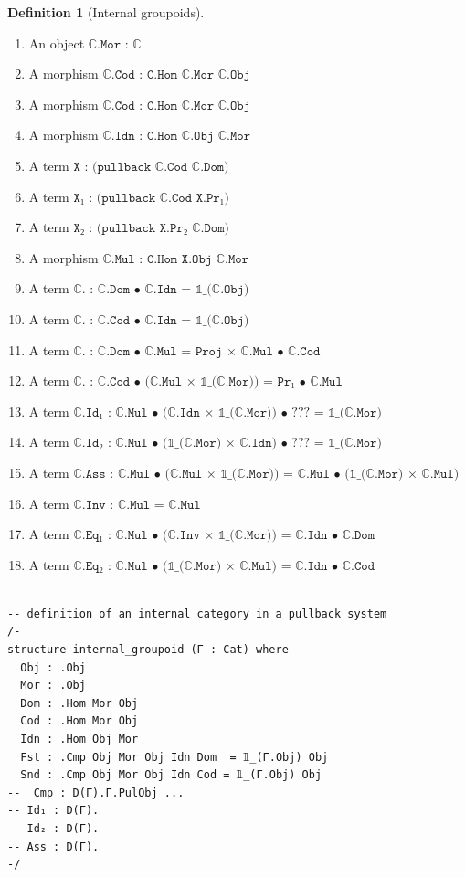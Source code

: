 \documentclass{book}
\theoremstyle{definition}
\newtheorem{definition}{Definition}
\newcounter{lcounter}
\begin{document}
\begin{definition}[Internal groupoids] 
\begin{enumerate}
\item An object $\texttt{ℂ.Mor : ℂ}$ 
\item A morphism $\texttt{ℂ.Cod : C.Hom ℂ.Mor ℂ.Obj}$
\item A morphism $\texttt{ℂ.Cod : C.Hom ℂ.Mor ℂ.Obj}$
\item A morphism $\texttt{ℂ.Idn : C.Hom ℂ.Obj ℂ.Mor}$
\item A term $\texttt{X : (pullback ℂ.Cod ℂ.Dom)}$
\item A term $\texttt{X₁ : (pullback ℂ.Cod X.Pr₁)}$
\item A term $\texttt{X₂ : (pullback X.Pr₂ ℂ.Dom)}$
\item A morphism $\texttt{ℂ.Mul : C.Hom X.Obj ℂ.Mor}$
\item A term $\texttt{ℂ. : ℂ.Dom • ℂ.Idn = 𝟙\_(ℂ.Obj)}$
\item A term $\texttt{ℂ. : ℂ.Cod • ℂ.Idn = 𝟙\_(ℂ.Obj)}$
\item A term $\texttt{ℂ. : ℂ.Dom • ℂ.Mul =  Proj × ℂ.Mul • ℂ.Cod}$
\item A term $\texttt{ℂ. : ℂ.Cod • (ℂ.Mul × 𝟙\_(ℂ.Mor)) = Pr₁ • ℂ.Mul}$
\item A term $\texttt{ℂ.Id₁ : ℂ.Mul • (ℂ.Idn × 𝟙\_(ℂ.Mor)) • ??? = 𝟙\_(ℂ.Mor)}$
\item A term $\texttt{ℂ.Id₂ : ℂ.Mul • (𝟙\_(ℂ.Mor) × ℂ.Idn) • ??? = 𝟙\_(ℂ.Mor)}$
\item A term $\texttt{ℂ.Ass : ℂ.Mul • (ℂ.Mul × 𝟙\_(ℂ.Mor)) = ℂ.Mul • (𝟙\_(ℂ.Mor) × ℂ.Mul)}$
\item A term $\texttt{ℂ.Inv : ℂ.Mul = ℂ.Mul}$
\item A term $\texttt{ℂ.Eq₁ : ℂ.Mul • (ℂ.Inv × 𝟙\_(ℂ.Mor)) = ℂ.Idn • ℂ.Dom}$
\item A term $\texttt{ℂ.Eq₂ : ℂ.Mul • (𝟙\_(ℂ.Mor) × ℂ.Mul) = ℂ.Idn • ℂ.Cod}$
\end{enumerate}
\end{definition}


\begin{center}
\begin{tcolorbox}[width=5in,colback={white},title={\begin{center}\texttt{Lean \thelcounter} \addtocounter{lcounter}{1}  \end{center}},colbacktitle=Blue,coltitle=black]
\begin{verbatim}

-- definition of an internal category in a pullback system
/-
structure internal_groupoid (Γ : Cat) where
  Obj : .Obj
  Mor : .Obj
  Dom : .Hom Mor Obj
  Cod : .Hom Mor Obj
  Idn : .Hom Obj Mor
  Fst : .Cmp Obj Mor Obj Idn Dom  = 𝟙_(Γ.Obj) Obj
  Snd : .Cmp Obj Mor Obj Idn Cod = 𝟙_(Γ.Obj) Obj
--  Cmp : D(Γ).Γ.PulObj ...
-- Id₁ : D(Γ).
-- Id₂ : D(Γ).
-- Ass : D(Γ).
-/

\end{verbatim}
\end{tcolorbox}
\end{center}
\end{document}
